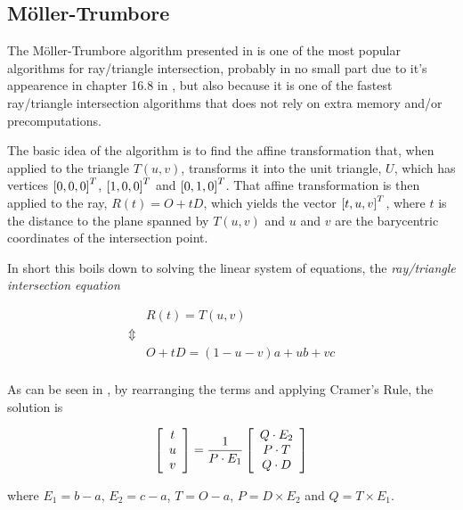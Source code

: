 \subsection{Möller-Trumbore}


The Möller-Trumbore algorithm presented in 
is one of the most popular algorithms for ray/triangle intersection,
probably in no small part due to it's appearence in chapter 16.8 in
, but also because it is one of the fastest
ray/triangle intersection algorithms that does not rely on extra
memory and/or precomputations.


The basic idea of the algorithm is to find the affine transformation
that, when applied to the triangle $T(u,v)$, transforms it into the unit
triangle, $U$, which has vertices $\left[0, 0, 0 \right]^T$,
$\left[1, 0, 0 \right]^T$ and $\left[0, 1, 0 \right]^T$. That affine
transformation is then applied to the ray, $R(t) = O + tD$, which
yields the vector $\left[t, u, v \right]^T$, where $t$ is the distance to
the plane spanned by $T(u,v)$ and $u$ and $v$ are the barycentric
coordinates of the intersection point.

In short this boils down to solving the linear system of equations,
the \textit{ray/triangle intersection equation}

\begin{displaymath}
  \begin{array}{rl}
    & R(t) = T(u,v) \\
    \Updownarrow \\
    & O + tD = (1-u-v)a + ub + vc \\
  \end{array}
\end{displaymath}

As can be seen in , by rearranging the
terms and applying Cramer's Rule, the solution is

\begin{displaymath}
  \left[\begin{array}{c} t \\ u \\ v \end{array}\right] = \frac{1}{P \cdot E_1} 
  \left[\begin{array}{c} Q \cdot E_2 \\ P \cdot T \\ Q \cdot D \end{array}\right]
\end{displaymath}

where $E_1 = b - a$, $E_2 = c - a$, $T = O - a$, $P = D \times  E_2$
and $Q = T \times  E_1$.

